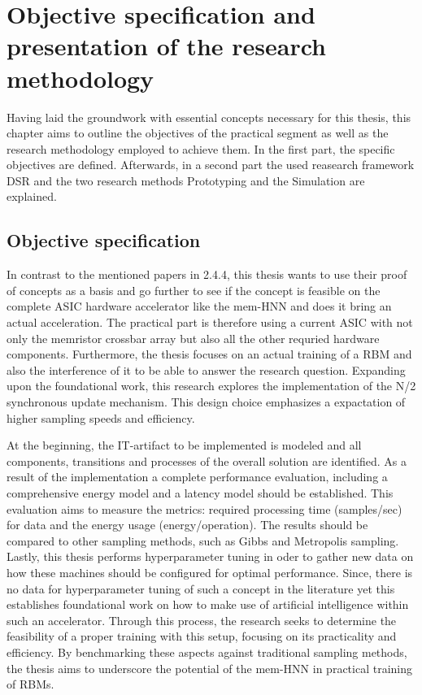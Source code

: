 \chapter{Objective specification and presentation of the research methodology}

Having laid the groundwork with essential concepts necessary for this thesis,
this chapter aims to outline the objectives of the practical segment as well as the research methodology employed to achieve them.
In the first part, the specific objectives are defined. 
Afterwards, in a second part the used reasearch framework \ac{DSR} and the two research methods Prototyping and the Simulation are explained.

\section{Objective specification}

In contrast to the mentioned papers in 2.4.4, this thesis wants to use their proof of concepts as a basis and go further to see if the concept
is feasible on the complete \ac{ASIC} hardware accelerator like the \ac{mem-HNN} and does it bring an actual acceleration.
The practical part is therefore using a current \ac{ASIC} with not only the memristor crossbar array but also all the other requried hardware components.
Furthermore, the thesis focuses on an actual training of a \ac{RBM} and also the interference of it to be able to answer the research question.
Expanding upon the foundational work, this research explores the implementation of the N/2 synchronous update mechanism.
This design choice emphasizes a expactation of higher sampling speeds and efficiency.

At the beginning, the \ac{IT}-artifact to be implemented is modeled and all components, transitions and processes of the overall solution are identified.
As a result of the implementation a complete performance evaluation, including a comprehensive energy model and a latency model should be established.
This evaluation aims to measure the metrics: required processing time (samples/sec) for data and the energy usage (energy/operation).
The results should be compared to other sampling methods, such as Gibbs and Metropolis sampling.
Lastly, this thesis performs hyperparameter tuning in oder to gather new data on how these machines should be configured for optimal performance.
Since, there is no data for hyperparameter tuning of such a concept in the literature yet this establishes foundational work on how to make use of artificial intelligence within such an accelerator.
Through this process, the research seeks to determine the feasibility of a proper training with this setup, focusing on its practicality and efficiency.
By benchmarking these aspects against traditional sampling methods, the thesis aims to underscore the potential of the \ac{mem-HNN} 
in practical training of \ac{RBM}s.

